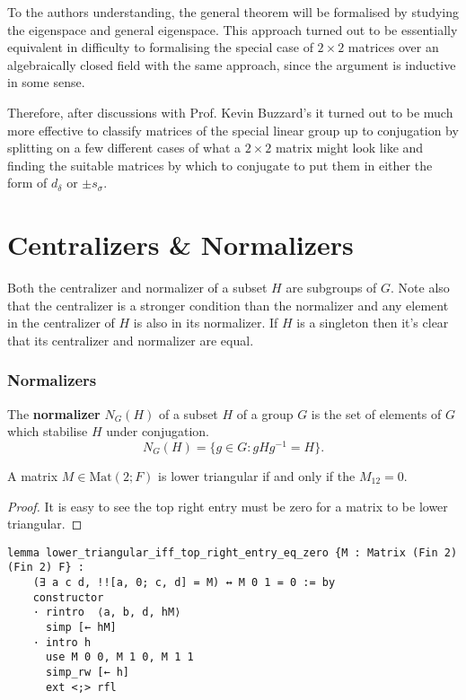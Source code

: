 \begin{remark}
To the authors understanding, the general theorem will be formalised by studying the eigenspace and general eigenspace. This approach turned out to be essentially equivalent in 
difficulty to formalising the special case of $2 \times 2$ matrices over an algebraically closed field with the same approach,
since the argument is inductive in some sense.


Therefore, after discussions with Prof. Kevin Buzzard's it turned out to be much more effective to classify matrices of the special linear group up to 
conjugation by splitting on a few different cases of what a $2 \times 2$ matrix might look like and finding the suitable matrices by which to conjugate to put them in either the form of $d_\delta$ or $\pm s_\sigma$.
\end{remark}

\section{Centralizers \& Normalizers}

Both the centralizer and normalizer of a subset $H$ are subgroups of $G$. Note also that the centralizer is a stronger condition than the 
normalizer and any element in the centralizer of $H$ is also in its normalizer. If $H$ is a singleton then it's clear that its centralizer and normalizer are equal.\\

\subsubsection{Normalizers}

\begin{definition}
The \textbf{normalizer} $N_G(H)$ of a subset $H$ of a group $G$ is the set of elements of $G$ which stabilise $H$ under conjugation.
\begin{equation*} N_G(H) = \{ g \in G : gHg^{-1}=H\}. \end{equation*}
\end{definition}


\begin{corollary}
    \label{lower_triangular_iff_top_right_entry_eq_zero}
    \leanok
    A matrix $M \in \textrm{Mat}(2; F)$ is lower triangular if and only if the $M_{12} = 0$.
\end{corollary}
\begin{proof}
    \leanok
It is easy to see the top right entry must be zero for a matrix to be lower triangular.
\end{proof}
\begin{footnotesize}
\begin{verbatim}
lemma lower_triangular_iff_top_right_entry_eq_zero {M : Matrix (Fin 2) (Fin 2) F} :
    (∃ a c d, !![a, 0; c, d] = M) ↔ M 0 1 = 0 := by
    constructor
    · rintro  ⟨a, b, d, hM⟩
      simp [← hM]
    · intro h
      use M 0 0, M 1 0, M 1 1
      simp_rw [← h]
      ext <;> rfl
\end{verbatim}
\end{footnotesize}

